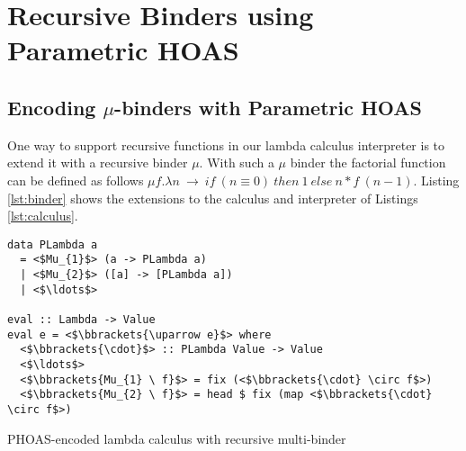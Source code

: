 \section{Recursive Binders using Parametric HOAS}\label{sec:recursive}

\subsection{Encoding $\mu$-binders with Parametric HOAS}
\label{subsec:binder}

One way to support recursive functions in our lambda calculus interpreter is to extend it with a recursive binder $\mu$. With such a $\mu$ binder the factorial function can be defined as follows $\mu f. \lambda n \ \to \ if \ (n \equiv 0) \ then \ 1 \ else \ n * f \ (n - 1)$. Listing \ref{lst:binder} shows the extensions to the calculus and interpreter of Listings \ref{lst:calculus}.

\begin{listing}[H]
\begin{verbatim}
data PLambda a
  = <$Mu_{1}$> (a -> PLambda a)
  | <$Mu_{2}$> ([a] -> [PLambda a])
  | <$\ldots$>

eval :: Lambda -> Value
eval e = <$\bbrackets{\uparrow e}$> where
  <$\bbrackets{\cdot}$> :: PLambda Value -> Value
  <$\ldots$>
  <$\bbrackets{Mu_{1} \ f}$> = fix (<$\bbrackets{\cdot} \circ f$>)
  <$\bbrackets{Mu_{2} \ f}$> = head $ fix (map <$\bbrackets{\cdot} \circ f$>)

\end{verbatim}
\caption{PHOAS-encoded lambda calculus with recursive multi-binder}
\label{lst:binder}
\end{listing}
